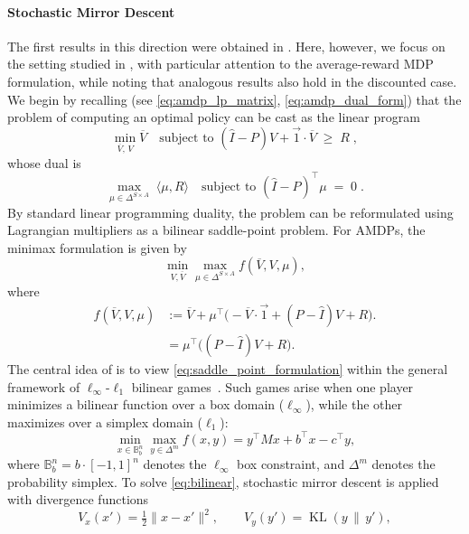 \documentclass{article}
\numberwithin{equation}{section}
\newcommand{\eqsp}{\;}
\begin{document}
\paragraph{Stochastic Mirror Descent}\label{par:smd} 
\normalfont\selectfont 
The first results in this direction were obtained in \cite{wang2020randomized}. Here, however, we focus on the setting studied in \cite{jin2020efficiently}, with particular attention to the average-reward MDP formulation, while noting that analogous results also hold in the discounted case.  
We begin by recalling (see \eqref{eq:amdp_lp_matrix}, \eqref{eq:amdp_dual_form}) that the problem of computing an optimal policy can be cast as the linear program
\[
    \min_{\overline{V},\, V}\overline{V} 
    \quad \text{subject to } (\widehat{I} - P)V + \vec{1}\cdot \overline{V} \;\geq\; R\eqsp,
\]
whose dual is
\[
    \max_{\mu{\in\Delta^{S\times A}}}\eqsp\langle\mu, R\rangle 
    \quad \text{subject to } {(\widehat{I} - P)^\top\mu} \;=\; 0\eqsp.
\]
By standard linear programming duality, the problem can be reformulated using Lagrangian multipliers as a bilinear saddle-point problem. For AMDPs, the minimax formulation is given by
\begin{equation}\label{eq:saddle_point_formulation}
    \min_{V,\overline{V}}\max_{\mu{\in \Delta^{S\times A}}} f(\overline{V}, V, \mu), 
\end{equation}
{where
\begin{align}
    f(\overline V,V,\mu) &:= \overline V + \mu^\top\big( -  \overline V \cdot\vec{1} + (P - \widehat I)V +R\big).\\
    &= 
\mu^\top\big((P - \widehat I)V +R\big).
\end{align}
}
The central idea of \cite{jin2020efficiently} is to view \eqref{eq:saddle_point_formulation} within the general framework of $\ell_\infty$-$\ell_1$ bilinear games~\cite{karmarkar2026solving}. Such games arise when one player minimizes a bilinear function over a box domain (\(\ell_\infty\)), while the other maximizes over a simplex domain (\(\ell_1\)): 
\begin{equation}\label{eq:bilinear}
    \min_{x \in \mathbb{B}_b^n} \max_{y \in \Delta^m}  f(x,y) 
    = y^\top Mx + b^\top x - c^\top y,
\end{equation}
where \(\mathbb{B}_b^n = b \cdot [-1,1]^n\) denotes the $\ell_\infty$ box constraint, and \(\Delta^m\) denotes the probability simplex.  
To solve \eqref{eq:bilinear}, stochastic mirror descent is applied with divergence functions
\[
    V_x(x') = \tfrac{1}{2}\|x - x'\|^2, 
    \qquad 
    V_y(y') = \operatorname{KL}(y \,\|\, y'),
\]
\end{document}
